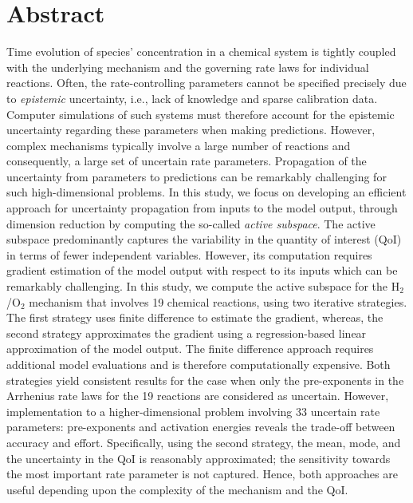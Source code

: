 \section*{Abstract}
Time evolution of species' concentration in a chemical system is tightly coupled
with the underlying mechanism and the governing rate laws for individual reactions.
Often, the rate-controlling parameters cannot be specified precisely 
due to \textit{epistemic} uncertainty, i.e., lack of knowledge and 
sparse calibration data. Computer simulations of such systems must
therefore account for the epistemic uncertainty regarding these parameters
when making predictions. However, complex mechanisms typically involve a large number of
reactions and consequently, a large set of uncertain rate parameters. Propagation of
the uncertainty from parameters to predictions can be remarkably challenging for
such high-dimensional problems. In this study, we focus on developing an efficient
approach for uncertainty propagation from inputs to the model output,
through dimension reduction by computing the
so-called
\textit{active subspace}. The active subspace
 predominantly captures the variability in the quantity of
interest (QoI) in terms of fewer independent variables. 
However, its computation requires gradient estimation of
the model output with respect to its inputs which can be
remarkably challenging. In this study, we compute the active subspace
for the H$_2$/O$_2$ mechanism that involves 19 chemical reactions,
using two iterative strategies. The first strategy uses finite difference 
to estimate the gradient, whereas, the second strategy approximates the
gradient using a regression-based linear approximation of the model output.
The finite difference approach requires additional model evaluations  and 
is therefore computationally expensive. Both strategies yield consistent
results for the case when only the pre-exponents in the Arrhenius rate laws
for the 19 reactions are considered as uncertain. However, implementation 
to a higher-dimensional problem involving 33 uncertain rate parameters:
pre-exponents and activation energies reveals the trade-off between 
accuracy and effort. Specifically, using the second strategy,
the mean, mode, and the uncertainty
in the QoI is reasonably approximated; the sensitivity towards the most
important rate parameter is not captured. Hence, both approaches are
useful depending upon the complexity of the mechanism and the QoI.